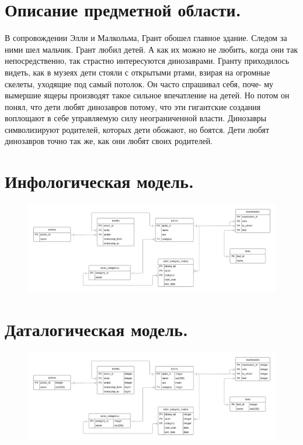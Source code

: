 
\vspace{3cm}
\tableofcontents

\newpage

\section{Описание предметной области.}
В сопровождении Элли и Малкольма, Грант обошел главное здание. Следом за ними шел мальчик. Грант любил детей. А как их
можно не любить, когда они так непосредственно, так страстно интересуются динозаврами. Гранту приходилось видеть, как в
музеях дети стояли с открытыми ртами, взирая на огромные скелеты, уходящие под самый потолок. Он часто спрашивал себя,
поче- му вымершие ящеры производят такое сильное впечатление на детей. Но потом он понял, что дети любят динозавров
потому, что эти гигантские создания воплощают в себе управляемую силу неограниченной власти. Динозавры символизируют
родителей, которых дети обожают, но боятся. Дети любят динозавров точно так же, как они любят своих родителей.

\section{Инфологическая модель.}
\begin{figure}[H]
	\centering
	\includegraphics[scale=0.15]{img/info_model}
\end{figure}

\section{Даталогическая модель.}
\begin{figure}[H]
	\centering
	\includegraphics[scale=0.15]{img/data_model}
\end{figure}

